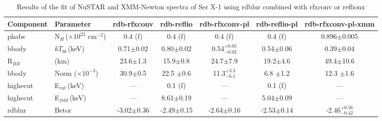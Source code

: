 \documentclass{aa}
\begin{document}



\begin{table*}
\caption{Results of the fit of NuSTAR and XMM-Newton spectra of Ser X-1 using rdblur combined with rfxconv or reflionx \label{tab:fit_2}}             
  
  
    
\centering          
\scriptsize





\begin{tabular}{llccccc}     %
\hline\hline       

Component &
Parameter &



rdb-rfxconv &
rdb-reflio&
rdb-rfxconv-pl&
rdb-reflio-pl &
rdb-rfxconv-pl-xmm  \\

\hline

phabs & 
N$_{H}\,$($\times10^{22}$ cm$^{-2}$) & 
0.4 (f) &
0.4 (f) &
0.4 (f) &
0.4 (f) &
0.896$\pm$0.005 \\



bbody & 
$kT_{bb}\,$(keV) & 
0.71$\pm$0.02 &
0.80$\pm$0.02 & 
0.54$^{+0.05}_{-0.02}$ &
0.54$\pm$0.06 &
0.39$\pm$0.04 \\



R$_{BB}$ &
(km)  &  
23.6$\pm$1.3 &
15.9$\pm$0.8&
24.7$\pm$7.9 &
19.2$\pm$4.6 &
49.4$\pm$10.6\\


bbody & 
Norm ($\times10^{-3}$) &  
30.9$\pm$0.5 &
22.5 $\pm$0.6 &
11.3$^{+3.3}_{-6.1}$ &
6.8 $\pm$1.2 &
12.3 $\pm$1.6 \\




\hline

highecut &
E$_{cut}\,$(keV)   & 
--- &
0.1 (f) &
--- & 
0.1 (f) &
--- \\


highecut &
E$_{fold}\,$(keV)   & 
--- &
8.61$\pm$0.19 & 
--- &
5.04$\pm$0.09  &
--- \\

\hline

rdblur & 
Betor  & 
-3.02$\pm$0.36 &
-2.49$\pm$0.15 & 
-2.64$\pm$0.16 &
-2.53$\pm$0.14 &
-2.46$^{+0.56}_{-0.42}$ \\


\end{tabular}
\end{table*}
\end{document}
